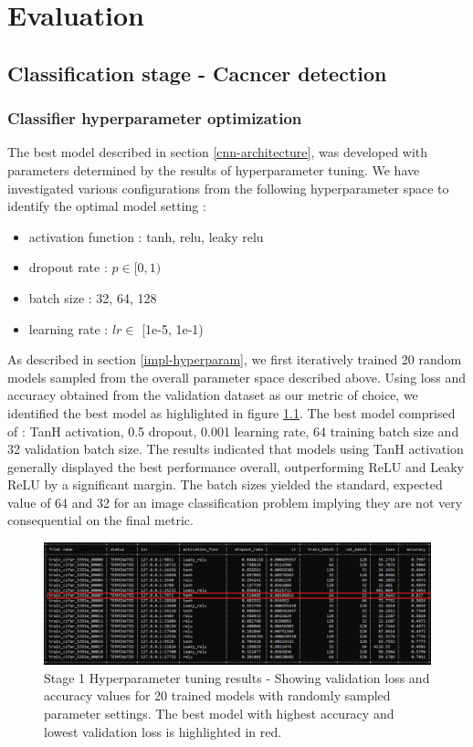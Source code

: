 \documentclass{l4proj}
\begin{document}
\chapter{Evaluation} 
\section{Classification stage - Cacncer detection}
\subsection{Classifier hyperparameter optimization}
The best model described in section \ref{cnn-architecture}, was developed with parameters determined by the results of hyperparameter tuning. We have investigated various configurations from the following hyperparameter space to identify the optimal model setting :
\begin{itemize}
    \item  activation function : tanh, relu, leaky relu
    \item dropout rate : \(p \in [0, 1)\)
    \item batch size : 32, 64, 128
    \item learning rate : \(lr \in \) [1e-5, 1e-1)
\end{itemize}

As described in section \ref{impl-hyperparam}, we first iteratively trained 20 random models sampled from the overall parameter space described above. Using loss and accuracy obtained from the validation dataset as our metric of choice, we identified the best model as highlighted in figure \ref{fig:tuning-stage-1}. The best model comprised of : TanH activation, 0.5 dropout, 0.001 learning rate, 64 training batch size and 32 validation batch size. The results indicated that models using TanH activation generally displayed the best performance overall, outperforming ReLU and Leaky ReLU by a significant margin. The batch sizes yielded the standard, expected value of 64 and 32 for an image classification problem implying they are not very consequential on the final metric. 

\begin{figure}[h]
    \centering
    \includegraphics[scale=0.4]{images/tuning-stage1.png}
    \caption{Stage 1 Hyperparameter tuning results - Showing validation loss and accuracy values for 20 trained models with randomly sampled parameter settings. The best model with highest accuracy and lowest validation loss is highlighted in red. }
    \label{fig:tuning-stage-1}
\end{figure}
\end{document}
